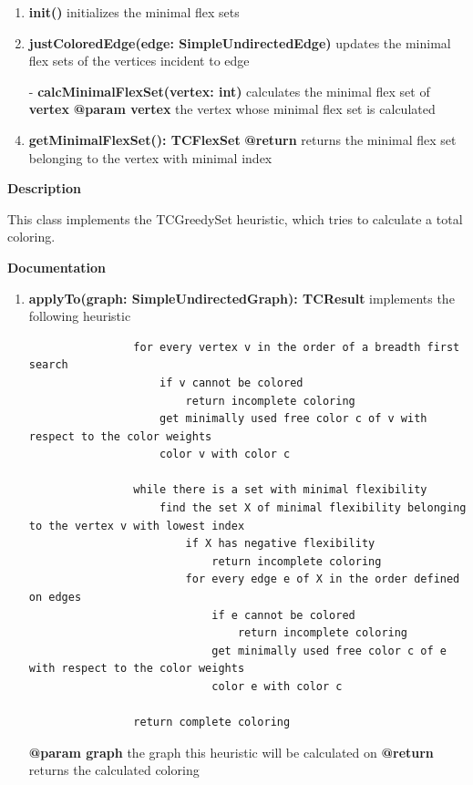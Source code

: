 	\begin{enumerate}[\#]
		\item{
			\textbf{init()} \newline
			initializes the minimal flex sets
		}
		\item{
			\textbf{justColoredEdge(edge: SimpleUndirectedEdge)} \newline
			updates the minimal flex sets of the vertices incident to edge
		}
		\item[-]{
			\textbf{calcMinimalFlexSet(vertex: int)} \newline
			calculates the minimal flex set of \textbf{vertex} \newline
			\textbf{@param vertex} the vertex whose minimal flex set is calculated
		}
		\item{
			\textbf{getMinimalFlexSet(): TCFlexSet} \newline
			\textbf{@return} returns the minimal flex set belonging to the vertex with minimal index
		}
	\end{enumerate}
	
	
	\textbf{Description}
	
	This class implements the TCGreedySet heuristic, which tries to calculate a total coloring.
	
	\textbf{Documentation}
			
	
	\begin{enumerate}[+]
		\item 
			\textbf{applyTo(graph: SimpleUndirectedGraph): TCResult} \newline
			implements the following heuristic		
						
			\begin{verbatim}
				for every vertex v in the order of a breadth first search
				    if v cannot be colored
				        return incomplete coloring
				    get minimally used free color c of v with respect to the color weights
				    color v with color c
				    
				while there is a set with minimal flexibility
				    find the set X of minimal flexibility belonging to the vertex v with lowest index
				        if X has negative flexibility
				            return incomplete coloring
				        for every edge e of X in the order defined on edges
				            if e cannot be colored
				                return incomplete coloring
				            get minimally used free color c of e with respect to the color weights
				            color e with color c
				        
				return complete coloring			
			\end{verbatim}
			
			
			\textbf{@param graph} the graph this heuristic will be calculated on \newline
			\textbf{@return} returns the calculated coloring
		
	\end{enumerate}
	
